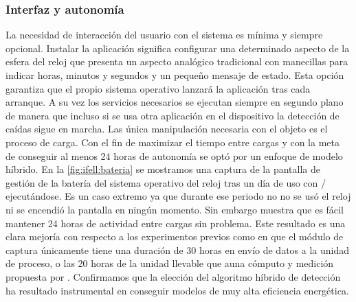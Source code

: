 \subsubsection{Interfaz y autonomía}
La necesidad de interacción del usuario con el sistema es mínima y siempre opcional. Instalar la aplicación significa configurar una determinado aspecto de la esfera del reloj que presenta un aspecto analógico tradicional con manecillas para indicar horas, minutos y segundos y un pequeño mensaje de estado. Esta opción garantiza que el propio sistema operativo lanzará la aplicación tras cada arranque. A su vez los servicios necesarios se ejecutan siempre en segundo plano de manera que incluso si se usa otra aplicación en el dispositivo la detección de caídas sigue en marcha. Las única manipulación necesaria con el objeto es el proceso de carga. Con el fin de maximizar el tiempo entre cargas y con la meta de conseguir al menos 24 horas de autonomía se optó por un enfoque de modelo híbrido. En la \autoref{fig:ifell:bateria} se mostramos una captura de la pantalla de gestión de la batería del sistema operativo del reloj tras un día de uso con \ifell/ ejecutándose. Es un caso extremo ya que durante ese periodo no no se usó el reloj ni se encendió la pantalla en ningún momento. Sin embargo muestra que es fácil mantener 24 horas de actividad entre cargas sin problema. Este resultado es una clara mejoría con respecto a los experimentos previos como  en que el módulo de captura únicamente tiene una duración de 30 horas en envío de datos a la unidad de proceso, o las 20 horas de la unidad llevable que auna cómputo y medición propuesta por . Confirmamos que la elección del algoritmo híbrido de detección ha resultado instrumental en conseguir modelos de muy alta eficiencia energética.


